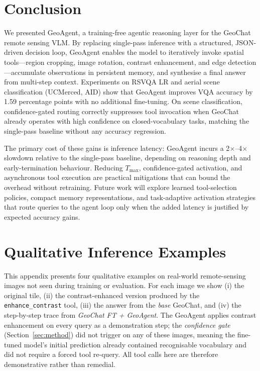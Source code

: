 \documentclass{article}
\begin{document}
\section{Conclusion}
\label{sec:conclusion}

We presented GeoAgent, a training-free agentic reasoning layer for the GeoChat
remote sensing VLM.  By replacing single-pass inference with a structured,
JSON-driven decision loop, GeoAgent enables the model to iteratively invoke spatial
tools---region cropping, image rotation, contrast enhancement, and edge
detection---accumulate observations in persistent memory, and synthesise a final
answer from multi-step context.  Experiments on RSVQA LR and
aerial scene classification (UCMerced, AID) show that GeoAgent improves VQA
accuracy by 1.59 percentage points with no additional fine-tuning.  On scene
classification, confidence-gated routing correctly suppresses tool invocation
when GeoChat already operates with high confidence on closed-vocabulary tasks,
matching the single-pass baseline without any accuracy regression.

The primary cost of these gains is inference latency: GeoAgent incurs a
2$\times$--4$\times$ slowdown relative to the single-pass baseline, depending on
reasoning depth and early-termination behaviour.  Reducing $T_{\max}$,
confidence-gated activation, and asynchronous tool execution are practical
mitigations that can bound the overhead without retraining.  Future work will
explore learned tool-selection policies, compact memory representations, and
task-adaptive activation strategies that route queries to the agent loop only when
the added latency is justified by expected accuracy gains.




\appendix
\section{Qualitative Inference Examples}
\label{app:qualitative}

This appendix presents four qualitative examples on real-world remote-sensing
images not seen during training or evaluation.  For each image we show (i) the
original tile, (ii) the contrast-enhanced version produced by the
\texttt{enhance\_contrast} tool, (iii) the answer from the \emph{base}
GeoChat, and (iv) the step-by-step trace from \emph{GeoChat FT + GeoAgent}.
The GeoAgent applies contrast enhancement on every query as a demonstration
step; the \emph{confidence gate} (Section~\ref{sec:method}) did not trigger on
any of these images, meaning the fine-tuned model's initial prediction already
contained recognisable vocabulary and did not require a forced tool re-query.
All tool calls here are therefore demonstrative rather than remedial.
\end{document}
